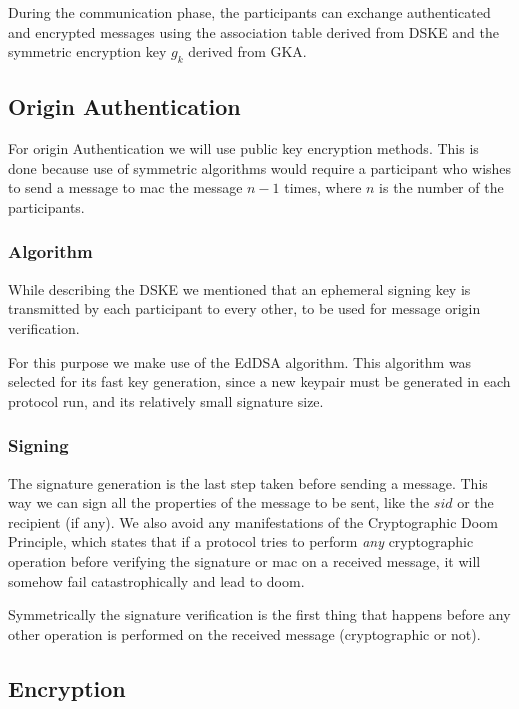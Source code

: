 \documentclass[12pt,titlepage,a4paper]{article}
\begin{document}
{During the communication phase, the participants can exchange authenticated
and encrypted messages using the association table derived from DSKE and the
symmetric encryption key $g_k$ derived from GKA.

\subsection{Origin Authentication}

For origin Authentication we will use public key encryption methods. This is
done because use of symmetric algorithms would require a participant who
wishes to send a message to mac the message $n-1$ times, where $n$ is the
number of the participants.

\subsubsection{Algorithm}

While describing the DSKE we mentioned that an ephemeral signing key is transmitted
by each participant to every other, to be used for message origin verification.

For this purpose we make use of the EdDSA algorithm. This algorithm was selected
for its fast key generation, since a new keypair must be generated in each protocol
run, and its relatively small signature size.

\subsubsection{Signing} \label{signing}

The signature generation is the last step taken before sending a message. This
way we can sign all the properties of the message to be sent, like the $sid$ or the
recipient (if any). We also avoid any manifestations of the Cryptographic Doom
Principle, which states that if a protocol tries to perform \emph{any}
cryptographic operation before verifying the signature or mac on a received
message, it will somehow fail catastrophically and lead to doom.

Symmetrically the signature verification is the first thing that happens before
any other operation is performed on the received message (cryptographic or not).

\subsection{Encryption}

}
\end{document}
